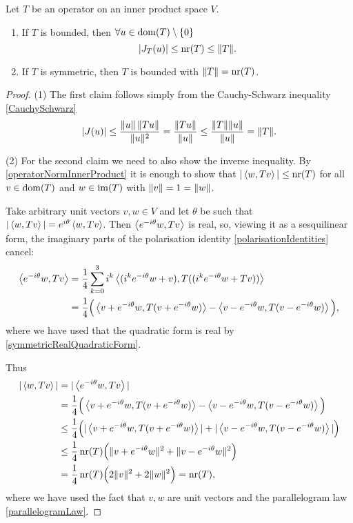 \begin{proposition} \label{normNumRadius}
Let $T$ be an operator on an inner product space $V$.
\begin{enumerate}
\item If $T$ is bounded, then $\forall u\in \operatorname{dom}(T)\setminus\{0\}$
\[ |J_T(u)| \leq \operatorname{nr}(T) \leq \lVert T\rVert. \]
\item If $T$ is symmetric, then $T$ is bounded with $\lVert T\rVert = \operatorname{nr}(T)$.
\end{enumerate}
\end{proposition}
\begin{proof}
(1) The first claim follows simply from the Cauchy-Schwarz inequality \ref{CauchySchwarz}
\[ |J(u)| \leq \frac{\lVert u\rVert\,\lVert Tu\rVert}{\lVert u\rVert^2} = \frac{\lVert Tu\rVert}{\lVert u\rVert} \leq \frac{\lVert T\rVert\lVert u\rVert}{\lVert u\rVert} = \lVert T\rVert. \]

(2) For the second claim we need to also show the inverse inequality. By \ref{operatorNormInnerProduct} it is enough to show that $|\left\langle w,Tv \right\rangle| \leq \operatorname{nr}(T)$ for all $v\in \operatorname{dom}(T)$ and $w\in\operatorname{im}(T)$ with $\lVert v\rVert = 1 = \lVert w\rVert$.

Take arbitrary unit vectors $v,w\in V$ and let $\theta$ be such that $|\left\langle w,Tv \right\rangle| = e^{i\theta}\left\langle w,Tv \right\rangle$. Then $\left\langle e^{-i\theta}w,Tv \right\rangle$ is real, so, viewing it as a sesquilinear form, the imaginary parts of the polarisation identity \ref{polarisationIdentities} cancel:
\begin{align*}
\left\langle e^{-i\theta}w,Tv \right\rangle &= \frac{1}{4}\sum_{k=0}^3i^k \left\langle (i^ke^{-i\theta}w + v), T((i^ke^{-i\theta}w + Tv)) \right\rangle \\
&= \frac{1}{4}\Big( \left\langle v+e^{-i\theta}w, T(v+e^{-i\theta}w) \right\rangle - \left\langle v-e^{-i\theta}w, T(v-e^{-i\theta}w) \right\rangle \Big),
\end{align*}
where we have used that the quadratic form is real by \ref{symmetricRealQuadraticForm}.

Thus
\begin{align*}
|\left\langle w,Tv \right\rangle| &= |\left\langle e^{-i\theta}w,Tv \right\rangle| \\
&= \frac{1}{4}\Big(\left\langle v+e^{-i\theta}w, T(v+e^{-i\theta}w) \right\rangle - \left\langle v-e^{-i\theta}w, T(v-e^{-i\theta}w) \right\rangle \Big) \\
&\leq \frac{1}{4}\Big( |\left\langle v+e^{-i\theta}w, T(v+e^{-i\theta}w) \right\rangle| + |\left\langle v-e^{-i\theta}w, T(v-e^{-i\theta}w) \right\rangle| \Big) \\
&\leq \frac{1}{4}\operatorname{nr}(T)\Big( \lVert v+e^{-i\theta}w\rVert^2 + \lVert v-e^{-i\theta}w\rVert^2 \Big) \\
&= \frac{1}{4}\operatorname{nr}(T)\Big( 2\lVert v\rVert^2 + 2\lVert w\rVert^2 \Big) = \operatorname{nr}(T),
\end{align*}
where we have used the fact that $v,w$ are unit vectors and the parallelogram law \ref{parallelogramLaw}.
\end{proof}
